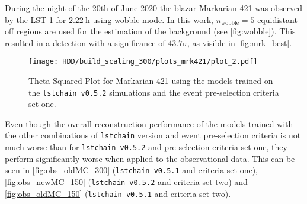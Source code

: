 During the night of the 20th of June 2020 the blazar Markarian 421 was observed by the LST-1 for $\SI{2.22}{\hour}$ using wobble mode.
In this work, $n_\text{wobble} = \num{5}$ equidistant off regions are used for the estimation of the background (see \autoref{fig:wobble}).
This resulted in a detection with a significance of $\num{43.7} \sigma$, as visible in \autoref{fig:mrk_best}.
\begin{figure}
    \centering
    \texttt{[image: HDD/build\_scaling\_300/plots\_mrk421/plot\_2.pdf]}
    \caption{Theta-Squared-Plot for Markarian 421 using the models trained on the \texttt{lstchain v0.5.2} simulations and the event pre-selection criteria set one.}
    \label{fig:mrk_best}
\end{figure}

Even though the overall reconstruction performance of the models trained with the other combinations of \texttt{lstchain} version and event pre-selection criteria
is not much worse than for \texttt{lstchain v0.5.2} and pre-selection criteria set one, they perform significantly worse when applied to the observational data.
This can be seen in \autoref{fig:obs_oldMC_300} (\texttt{lstchain v0.5.1} and criteria set one), \autoref{fig:obs_newMC_150} (\texttt{lstchain v0.5.2} and criteria set two)
and \autoref{fig:obs_oldMC_150} (\texttt{lstchain v0.5.1} and criteria set two).
